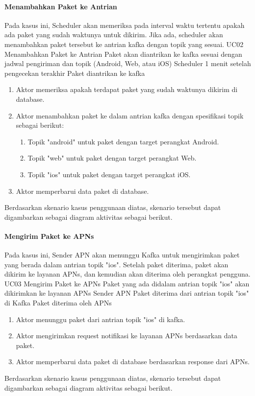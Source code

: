\paragraph{Menambahkan Paket ke Antrian}
\par Pada kasus ini, Scheduler akan memeriksa pada interval waktu tertentu apakah ada paket yang sudah waktunya untuk
dikirim. Jika ada, scheduler akan menambahkan paket tersebut ke antrian kafka dengan topik yang sesuai.
\tableUcDesc
{UC02}
{Menambahkan Paket ke Antrian}
{Paket akan diantrikan ke kafka sesuai dengan jadwal pengiriman dan topik (Android, Web, atau iOS)}
{Scheduler}
{1 menit setelah pengecekan terakhir}
{Paket diantrikan ke kafka}
{
\begin{enumerate}
    \item Aktor memeriksa apakah terdapat paket yang sudah waktunya dikirim di database.
    \item Aktor menambahkan paket ke dalam antrian kafka dengan spesifikasi topik sebagai berikut:
    \begin{enumerate}
        \item Topik "android" untuk paket dengan target perangkat Android.
        \item Topik "web" untuk paket dengan target perangkat Web.
        \item Topik "ios" untuk paket dengan target perangkat iOS.
    \end{enumerate}
    \item Aktor memperbarui data paket di database.
\end{enumerate}
}
\par Berdasarkan skenario kasus penggunaan diatas, skenario tersebut dapat digambarkan sebagai diagram aktivitas
sebagai berikut.

\paragraph{Mengirim Paket ke APNs}
\par Pada kasus ini, Sender APN akan menunggu Kafka untuk mengirimkan paket yang berada dalam antrian topik "ios".
Setelah paket diterima, paket akan dikirim ke layanan APNs, dan kemudian akan diterima oleh perangkat pengguna.
\tableUcDesc
{UC03}
{Mengirim Paket ke APNs}
{Paket yang ada didalam antrian topik "ios" akan dikirimkan ke layanan APNs}
{Sender APN}
{Paket diterima dari antrian topik "ios" di Kafka}
{Paket diterima oleh APNs}
{
\begin{enumerate}
    \item Aktor menunggu paket dari antrian topik "ios" di kafka.
    \item Aktor mengirimkan request notifikasi ke layanan APNs berdasarkan data paket.
    \item Aktor memperbarui data paket di database berdasarkan response dari APNs.
\end{enumerate}
}
\par Berdasarkan skenario kasus penggunaan diatas, skenario tersebut dapat digambarkan sebagai diagram aktivitas
sebagai berikut.

